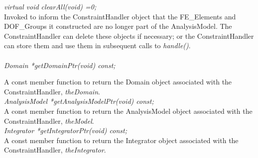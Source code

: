 {\em virtual void clearAll(void) =0;} \\
Invoked to inform the ConstraintHandler object that the FE\_Elements
and DOF\_Groups it constructed are no longer part of the AnalysisModel. The
ConstraintHandler can delete these objects if necessary; or the
ConstraintHandler can store them and use them in subsequent calls to
{\em handle()}. \\ 

  \\
{\em Domain *getDomainPtr(void) const;} 

A const member function to return the Domain object associated with
the ConstraintHandler, {\em theDomain}. \\

{\em AnalysisModel *getAnalysisModelPtr(void) const;} \\
A const member function to return the AnalysisModel object associated with
the ConstraintHandler, {\em theModel}. \\

{\em Integrator *getIntegratorPtr(void) const;} \\
A const member function to return the Integrator object associated with
the ConstraintHandler, {\em theIntegrator}. 





